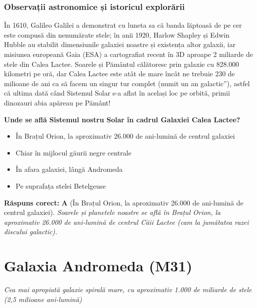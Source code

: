 \subsubsection*{Observații astronomice și istoricul explorării}
În 1610, Galileo Galilei a demonstrat cu luneta sa că banda lăptoasă de pe cer este compusă din nenumărate stele; în anii 1920, Harlow Shapley și Edwin Hubble au stabilit dimensiunile galaxiei noastre și existența altor galaxii, iar misiunea europeană Gaia (ESA) a cartografiat recent în 3D aproape 2 miliarde de stele din Calea Lactee. Soarele și Pământul călătoresc prin galaxie cu 828.000 kilometri pe oră, dar Calea Lactee este atât de mare încât ne trebuie 230 de milioane de ani ca să facem un singur tur complet (numit \quotedblbase{}un an galactic\textquotedblright{}), astfel că ultima dată când Sistemul Solar s-a aflat în același loc pe orbită, primii dinozauri abia apăreau pe Pământ!

\vspace{6pt}
\begin{tcolorbox}[orbitarquiz, title={\textbf{Întrebare de verificare \#65: Calea Lactee (Galaxia Noastră)}}]
\textbf{Unde se află Sistemul nostru Solar în cadrul Galaxiei Calea Lactee?}
\begin{itemize}[leftmargin=2.2em, itemsep=2pt, topsep=4pt]
  \item[$\square$ \textbf{A.}] În Brațul Orion, la aproximativ 26.000 de ani-lumină de centrul galaxiei
  \item[$\square$ \textbf{B.}] Chiar în mijlocul găurii negre centrale
  \item[$\square$ \textbf{C.}] În afara galaxiei, lângă Andromeda
  \item[$\square$ \textbf{D.}] Pe suprafața stelei Betelgeuse
\end{itemize}
\vspace{2pt}
{\footnotesize\color{orbitarMuted}\textbf{Răspuns corect:} \textbf{A} (În Brațul Orion, la aproximativ 26.000 de ani-lumină de centrul galaxiei). \emph{Soarele și planetele noastre se află în Brațul Orion, la aproximativ 26.000 de ani-lumină de centrul Căii Lactee (cam la jumătatea razei discului galactic).}}
\end{tcolorbox}
\clearpage


\section{Galaxia Andromeda (M31)}
\label{sec:body-andromeda}
\vspace{-4pt}
{\large\itshape\color{orbitarAccent} Cea mai apropiată galaxie spirală mare, cu aproximativ 1.000 de miliarde de stele (2,5 milioane ani-lumină)}\\[4pt]


